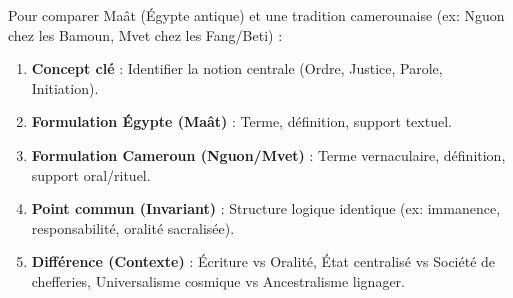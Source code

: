 \documentclass[11pt]{article}
\newcommand{\cle}[1]{{\popxbold\color{popdark}#1}}
\begin{document}
\begin{methode}
Pour comparer Maât (Égypte antique) et une tradition camerounaise (ex: \cle{Nguon} chez les Bamoun, \cle{Mvet} chez les Fang/Beti) :
\begin{enumerate}
    \item \textbf{Concept clé} : Identifier la notion centrale (Ordre, Justice, Parole, Initiation).
    \item \textbf{Formulation Égypte (Maât)} : Terme, définition, support textuel.
    \item \textbf{Formulation Cameroun (Nguon/Mvet)} : Terme vernaculaire, définition, support oral/rituel.
    \item \textbf{Point commun (Invariant)} : Structure logique identique (ex: immanence, responsabilité, oralité sacralisée).
    \item \textbf{Différence (Contexte)} : Écriture vs Oralité, État centralisé vs Société de chefferies, Universalisme cosmique vs Ancestralisme lignager.
\end{enumerate}
\end{methode}
\end{document}
